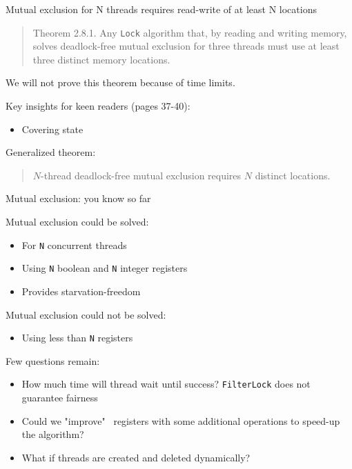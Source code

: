 \begin{frame}{Mutual exclusion for N threads requires read-write of at least N locations}

\begin{quote}
  Theorem 2.8.1. Any \texttt{Lock} algorithm that, by reading and writing memory, solves deadlock-free mutual exclusion for three threads must use at least three distinct memory locations.
\end{quote}

\pause

We will not prove this theorem because of time limits.

\pause

Key insights for keen readers (pages 37-40):
\begin{itemize}
  \item Covering state
\end{itemize}

\pause
Generalized theorem:
\begin{quote}
  $N$-thread deadlock-free mutual exclusion requires $N$ distinct locations.
\end{quote}

\end{frame}


\begin{frame}[fragile]{Mutual exclusion: you know so far}

Mutual exclusion could be solved:
\begin{itemize}
  \item For \texttt{N} concurrent threads
  \item Using \texttt{N} boolean and \texttt{N} integer registers
  \item Provides starvation-freedom
\end{itemize}

\pause

Mutual exclusion could not be solved:
\begin{itemize}
  \item Using less than \texttt{N} registers
\end{itemize}

\pause

Few questions remain:
\begin{itemize}
  \pause
  \item How much time will thread wait until success? \texttt{FilterLock} does not guarantee fairness

  \pause
  \item Could we "improve" \ registers with some additional operations to speed-up the algorithm?

  \pause
  \item What if threads are created and deleted dynamically?

\end{itemize}
\end{frame}


